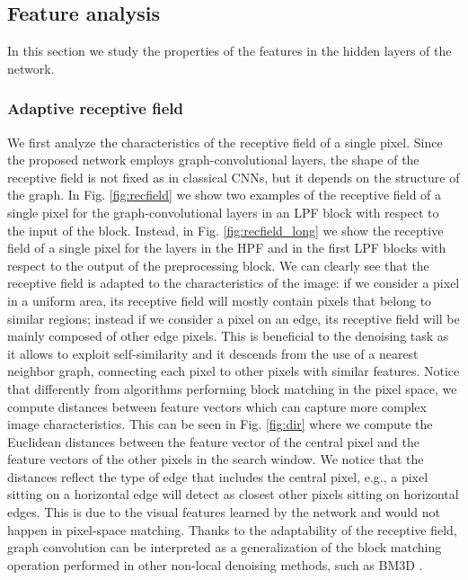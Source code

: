 \documentclass[journal]{IEEEtran}
\begin{document}
\subsection{Feature analysis}
In this section we study the properties of the features in the hidden layers of the network.

\subsubsection{Adaptive receptive field}
We first analyze the characteristics of the receptive field of a single pixel. Since the proposed network employs graph-convolutional layers, the shape of the receptive field is not fixed as in classical CNNs, but it depends on the structure of the graph. In Fig. \ref{fig:recfield} we show two examples of the receptive field of a single pixel for the graph-convolutional layers in an LPF block with respect to the input of the block. Instead, in Fig. \ref{fig:recfield_long} we show the receptive field of a single pixel for the layers in the HPF and in the first LPF blocks with respect to the output of the preprocessing block. We can clearly see that the receptive field is adapted to the characteristics of the image: if we consider a pixel in a uniform area, its receptive field will mostly contain pixels that belong to similar regions; instead if we consider a pixel on an edge, its receptive field will be mainly composed of other edge pixels. This is beneficial to the denoising task as it allows to exploit self-similarity and it descends from the use of a nearest neighbor graph, connecting each pixel to other pixels with similar features. Notice that differently from algorithms performing block matching in the pixel space, we compute distances between feature vectors which can capture more complex image characteristics. This can be seen in Fig. \ref{fig:dir} where we compute the Euclidean distances between the feature vector of the central pixel and the feature vectors of the other pixels in the search window. We notice that the distances reflect the type of edge that includes the central pixel, e.g., a pixel sitting on a horizontal edge will detect as closest other pixels sitting on horizontal edges. This is due to the visual features learned by the network and would not happen in pixel-space matching.
Thanks to the adaptability of the receptive field, graph convolution can be interpreted as a generalization of the block matching operation performed in other non-local denoising methods, such as BM3D \cite{dabov2007image}.
\end{document}
